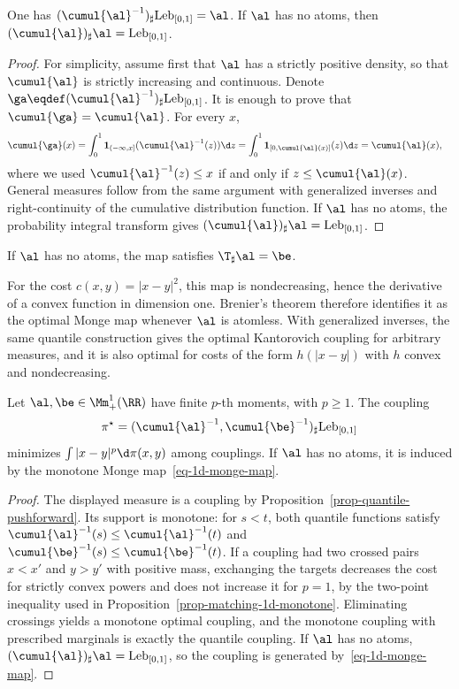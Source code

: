 \begin{prop}\label{prop-quantile-pushforward}
	One has $(\cumul{\al}^{-1})_\sharp\mathrm{Leb}_{[0,1]}=\al$. If $\al$ has no atoms, then $(\cumul{\al})_\sharp\al=\mathrm{Leb}_{[0,1]}$.
\end{prop}
\begin{proof}
	For simplicity, assume first that $\al$ has a strictly positive density, so that $\cumul{\al}$ is strictly increasing and continuous. Denote $\ga\eqdef(\cumul{\al}^{-1})_\sharp\mathrm{Leb}_{[0,1]}$. It is enough to prove that $\cumul{\ga}=\cumul{\al}$. For every $x$,
	\[
	\begin{aligned}
		\cumul{\ga}(x)
		&=
		\int_0^1 \mathbf 1_{(-\infty,x]}(\cumul{\al}^{-1}(z))\d z
		=
		\int_0^1 \mathbf 1_{[0,\cumul{\al}(x)]}(z)\d z
		=
		\cumul{\al}(x),
	\end{aligned}
	\]
	where we used $\cumul{\al}^{-1}(z)\leq x$ if and only if $z\leq\cumul{\al}(x)$. General measures follow from the same argument with generalized inverses and right-continuity of the cumulative distribution function. If $\al$ has no atoms, the probability integral transform gives $(\cumul{\al})_\sharp\al=\mathrm{Leb}_{[0,1]}$.
\end{proof}

If $\al$ has no atoms, the map
satisfies $\T_\sharp\al=\be$.

For the cost $c(x,y)=|x-y|^2$, this map is nondecreasing, hence the derivative of a convex function in dimension one. Brenier's theorem therefore identifies it as the optimal Monge map whenever $\al$ is atomless. With generalized inverses, the same quantile construction gives the optimal Kantorovich coupling for arbitrary measures, and it is also optimal for costs of the form $h(|x-y|)$ with $h$ convex and nondecreasing.

\begin{prop}\label{prop-1d-quantile-map}
	Let $\al,\be\in\Mm_+^1(\RR)$ have finite $p$-th moments, with $p\geq1$. The coupling
	\[
		\pi^\star=(\cumul{\al}^{-1},\cumul{\be}^{-1})_\sharp\mathrm{Leb}_{[0,1]}
	\]
	minimizes $\int |x-y|^p\d\pi(x,y)$ among couplings. If $\al$ has no atoms, it is induced by the monotone Monge map~\eqref{eq-1d-monge-map}.
\end{prop}
\begin{proof}
	The displayed measure is a coupling by Proposition~\ref{prop-quantile-pushforward}. Its support is monotone: for $s<t$, both quantile functions satisfy $\cumul{\al}^{-1}(s)\leq\cumul{\al}^{-1}(t)$ and $\cumul{\be}^{-1}(s)\leq\cumul{\be}^{-1}(t)$. If a coupling had two crossed pairs $x<x'$ and $y>y'$ with positive mass, exchanging the targets decreases the cost for strictly convex powers and does not increase it for $p=1$, by the two-point inequality used in Proposition~\ref{prop-matching-1d-monotone}. Eliminating crossings yields a monotone optimal coupling, and the monotone coupling with prescribed marginals is exactly the quantile coupling. If $\al$ has no atoms, $(\cumul{\al})_\sharp\al=\mathrm{Leb}_{[0,1]}$, so the coupling is generated by~\eqref{eq-1d-monge-map}.
\end{proof}

